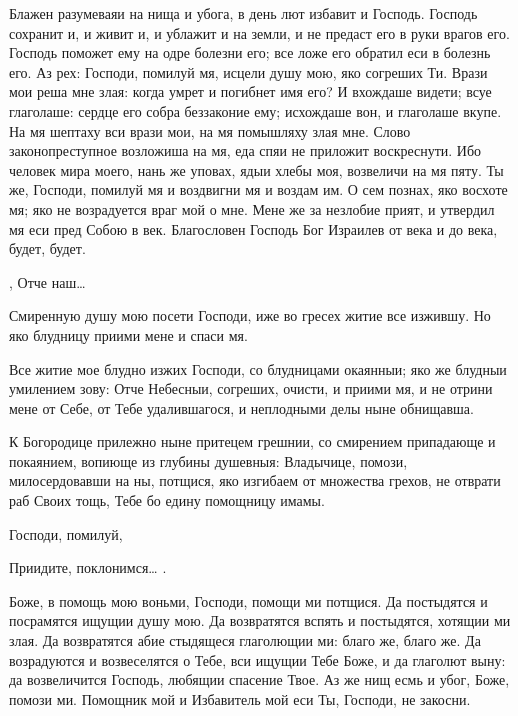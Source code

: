 \begin{mymulticols}


Блажен разумеваяи на нища и убога, в день лют избавит и Господь. Господь сохранит и, и живит и, и ублажит и на земли, и не предаст его в руки врагов его. Господь поможет ему на одре болезни его; все ложе его обратил еси в болезнь его. Аз рех: Господи, помилуй мя, исцели душу мою, яко согреших Ти. Врази мои реша мне злая: когда умрет и погибнет имя его? И вхождаше видети; всуе глаголаше: сердце его собра беззаконие ему; исхождаше вон, и глаголаше вкупе. На мя шептаху вси врази мои, на мя помышляху злая мне. Слово законопреступное возложиша на мя, еда спяи не приложит воскреснути. Ибо человек мира моего, нань же уповах, ядыи хлебы моя, возвеличи на мя пяту. Ты же, Господи, помилуй мя и воздвигни мя и воздам им. О сем познах, яко восхоте мя; яко не возрадуется враг мой о мне. Мене же за незлобие прият, и утвердил мя еси пред Собою в век. Благословен Господь Бог Израилев от века и до века, будет, будет.

 ,  Отче наш…




Смиренную душу мою посети Господи, иже во гресех житие все изжившу. Но яко блудницу приими мене и спаси мя.

 Все житие мое блудно изжих Господи, со блудницами окаянныи; яко же блудныи умилением зову: Отче Небесныи, согреших, очисти, и приими мя, и не отрини мене от Себе, от Тебе удалившагося, и неплодными делы ныне обнищавша.

 К Богородице прилежно ныне притецем грешнии, со смирением припадающе и покаянием, вопиюще из глубины душевныя: Владычице, помози, милосердовавши на ны, потщися, яко изгибаем от множества грехов, не отврати раб Своих тощь, Тебе бо едину помощницу имамы.


 Господи, помилуй, 


 Приидите, поклонимся… .




Боже, в помощь мою воньми, Господи, помощи ми потщися. Да постыдятся и посрамятся ищущии душу мою. Да возвратятся вспять и постыдятся, хотящии ми злая. Да возвратятся абие стыдящеся глаголющии ми: благо же, благо же. Да возрадуются и возвеселятся о Тебе, вси ищущии Тебе Боже, и да глаголют выну: да возвеличится Господь, любящии спасение Твое. Аз же нищ есмь и убог, Боже, помози ми. Помощник мой и Избавитель мой еси Ты, Господи, не закосни.



\end{mymulticols}
